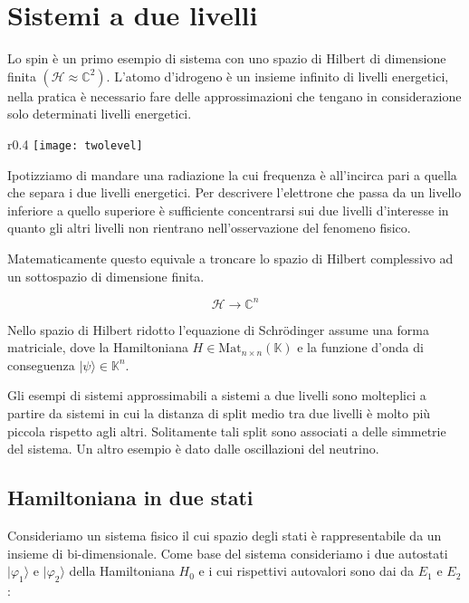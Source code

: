 \section{Sistemi a due livelli}

Lo spin \`e un primo esempio di sistema con uno spazio di Hilbert di dimensione finita $(\mathcal{H} \approx \mathbb{C}^2)$. L'atomo d'idrogeno \`e un insieme infinito di livelli energetici, nella pratica \`e necessario fare delle approssimazioni che tengano in considerazione solo determinati livelli energetici. 
\begin{wrapfigure}{r}{0.4\textwidth} %
    \centering
    \texttt{[image: twolevel]} %
\end{wrapfigure}

Ipotizziamo di mandare una radiazione la cui frequenza \`e all'incirca pari a quella che separa i due livelli energetici. Per descrivere l'elettrone che passa da un livello inferiore a quello superiore \`e sufficiente concentrarsi sui due livelli d'interesse in quanto gli altri livelli non rientrano nell'osservazione del fenomeno fisico. 

Matematicamente questo equivale a troncare lo spazio di Hilbert complessivo ad un sottospazio di dimensione finita. 

\begin{equation*}
	\mathcal{H} \to \mathbb{C}^n 
\end{equation*}
\vspace{0.3cm}


Nello spazio di Hilbert ridotto l'equazione di Schr\"odinger  assume una forma matriciale, dove la Hamiltoniana $H \in \text{Mat}_{n \times n}(\mathbb{K})$ e la funzione d'onda di conseguenza $|\psi \rangle \in \mathbb{K}^n$.
\newline

Gli esempi di sistemi approssimabili a sistemi a due livelli sono molteplici a partire da sistemi in cui la distanza di split medio tra due livelli \`e molto pi\`u piccola rispetto agli altri. Solitamente tali split sono associati a delle simmetrie del sistema. Un altro esempio \`e dato dalle oscillazioni del neutrino.

\subsection{Hamiltoniana in due stati}

Consideriamo un sistema fisico il cui spazio degli stati \`e rappresentabile da un insieme di bi-dimensionale. Come base del sistema consideriamo i due autostati $|\varphi_1 \rangle $ e $|\varphi_2 \rangle $ della Hamiltoniana $H_0$ e i cui rispettivi autovalori sono dai da $E_1$ e $E_2$:
\newpage 

